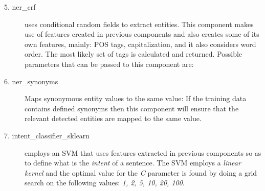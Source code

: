 \documentclass[11pt,a4paper]{article}
\begin{document}
\begin{description}
				\item[5. ner\_crf] 
				uses conditional random fields to extract entities. This component makes use of features created in previous components and also creates some of its own features, mainly: POS tags, capitalization, and it also considers word order. The most likely set of tags is calculated and returned. Possible parameters that can be passed to this component are: 
				
				\item[6. ner\_synonyms] 	
				Maps synonymous entity values to the same value: If the training data contains defined synonyms then this component will ensure that the relevant detected entities are mapped to the same value.
				
				\item[7. intent\_classifier\_sklearn] 
				employs an SVM that uses features extracted in previous components so as to define what is the \textit{intent} of a sentence. The SVM employs a \textit{linear kernel} and the optimal value for the \textit{C} parameter is found by doing a grid search on the following values: \textit{1, 2, 5, 10, 20, 100}.
				
			\end{description}
			
\end{document}
